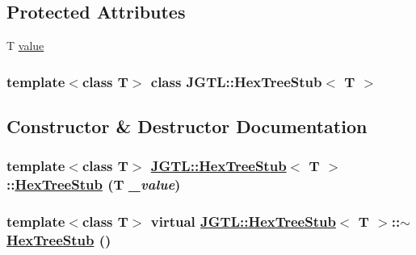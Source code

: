\subsection*{Protected Attributes}
\begin{CompactItemize}
\item 
T \hyperlink{class_j_g_t_l_1_1_hex_tree_stub_36b120793bf8032e9047c22875890a72}{value}
\end{CompactItemize}
\subsubsection*{template$<$class T$>$ class JGTL::Hex\-Tree\-Stub$<$ T $>$}



\subsection{Constructor \& Destructor Documentation}
\hypertarget{class_j_g_t_l_1_1_hex_tree_stub_b31acb7855ec45d8a98c96ab8793dda9}{
\subsubsection[HexTreeStub]{\setlength{\rightskip}{0pt plus 5cm}template$<$class T$>$ \hyperlink{class_j_g_t_l_1_1_hex_tree_stub}{JGTL::Hex\-Tree\-Stub}$<$ T $>$::\hyperlink{class_j_g_t_l_1_1_hex_tree_stub}{Hex\-Tree\-Stub} (T {\em \_\-value})}}
\label{class_j_g_t_l_1_1_hex_tree_stub_b31acb7855ec45d8a98c96ab8793dda9}


\hypertarget{class_j_g_t_l_1_1_hex_tree_stub_5ea48e0459e81668d3a3457cb0037be9}{
\subsubsection[$\sim$HexTreeStub]{\setlength{\rightskip}{0pt plus 5cm}template$<$class T$>$ virtual \hyperlink{class_j_g_t_l_1_1_hex_tree_stub}{JGTL::Hex\-Tree\-Stub}$<$ T $>$::$\sim$\hyperlink{class_j_g_t_l_1_1_hex_tree_stub}{Hex\-Tree\-Stub} ()}}
\label{class_j_g_t_l_1_1_hex_tree_stub_5ea48e0459e81668d3a3457cb0037be9}




